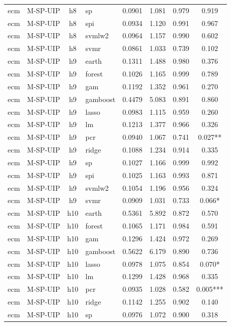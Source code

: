 \begin{ThreePartTable}
\begin{longtable}[t]{llclcccc}
ecm & M-SP-UIP & h8 & sp & 0.0901 & 1.081 & 0.979 & 0.919\\
ecm & M-SP-UIP & h8 & spi & 0.0934 & 1.120 & 0.991 & 0.967\\
ecm & M-SP-UIP & h8 & svmlw2 & 0.0964 & 1.157 & 0.990 & 0.602\\
ecm & M-SP-UIP & h8 & svmr & 0.0861 & 1.033 & 0.739 & 0.102\\
\addlinespace
ecm & M-SP-UIP & h9 & earth & 0.1311 & 1.488 & 0.980 & 0.376\\
ecm & M-SP-UIP & h9 & forest & 0.1026 & 1.165 & 0.999 & 0.789\\
ecm & M-SP-UIP & h9 & gam & 0.1192 & 1.352 & 0.961 & 0.270\\
ecm & M-SP-UIP & h9 & gamboost & 0.4479 & 5.083 & 0.891 & 0.860\\
ecm & M-SP-UIP & h9 & lasso & 0.0983 & 1.115 & 0.959 & 0.260\\
ecm & M-SP-UIP & h9 & lm & 0.1213 & 1.377 & 0.966 & 0.326\\
ecm & M-SP-UIP & h9 & pcr & 0.0940 & 1.067 & 0.741 & 0.027**\\
ecm & M-SP-UIP & h9 & ridge & 0.1088 & 1.234 & 0.914 & 0.335\\
ecm & M-SP-UIP & h9 & sp & 0.1027 & 1.166 & 0.999 & 0.992\\
ecm & M-SP-UIP & h9 & spi & 0.1025 & 1.163 & 0.993 & 0.871\\
ecm & M-SP-UIP & h9 & svmlw2 & 0.1054 & 1.196 & 0.956 & 0.324\\
ecm & M-SP-UIP & h9 & svmr & 0.0909 & 1.031 & 0.733 & 0.066*\\
\addlinespace
ecm & M-SP-UIP & h10 & earth & 0.5361 & 5.892 & 0.872 & 0.570\\
ecm & M-SP-UIP & h10 & forest & 0.1065 & 1.171 & 0.984 & 0.591\\
ecm & M-SP-UIP & h10 & gam & 0.1296 & 1.424 & 0.972 & 0.269\\
ecm & M-SP-UIP & h10 & gamboost & 0.5622 & 6.179 & 0.890 & 0.736\\
ecm & M-SP-UIP & h10 & lasso & 0.0978 & 1.075 & 0.854 & 0.070*\\
ecm & M-SP-UIP & h10 & lm & 0.1299 & 1.428 & 0.968 & 0.335\\
ecm & M-SP-UIP & h10 & pcr & 0.0935 & 1.028 & 0.582 & 0.005***\\
ecm & M-SP-UIP & h10 & ridge & 0.1142 & 1.255 & 0.902 & 0.140\\
ecm & M-SP-UIP & h10 & sp & 0.0976 & 1.072 & 0.900 & 0.318\\

\end{longtable}
\end{ThreePartTable}
